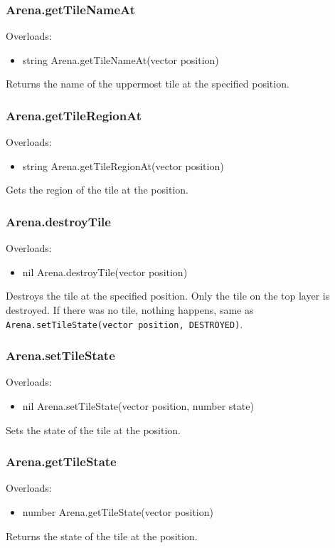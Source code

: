 \documentclass{book}
\newenvironment{ulist}
	{\begin{itemize}
			\itemsep0em}
	{\end{itemize}}
\begin{document}
\subsubsection{Arena.getTileNameAt}
Overloads:
\begin{ulist}
	\item string Arena.getTileNameAt(vector position)
\end{ulist}
Returns the name of the uppermost tile at the specified position.

\subsubsection{Arena.getTileRegionAt}
Overloads:
\begin{ulist}
	\item string Arena.getTileRegionAt(vector position)
\end{ulist}
Gets the region of the tile at the position.

\subsubsection{Arena.destroyTile}
Overloads:
\begin{ulist}
	\item nil Arena.destroyTile(vector position)
\end{ulist}
Destroys the tile at the specified position. Only the tile on the top layer is destroyed. If there was no tile, nothing happens, same as \texttt{Arena.setTileState(vector position, DESTROYED)}.

\subsubsection{Arena.setTileState}
Overloads:
\begin{ulist}
	\item nil Arena.setTileState(vector position, number state)
\end{ulist}
Sets the state of the tile at the position.

\subsubsection{Arena.getTileState}
Overloads:
\begin{ulist}
	\item number Arena.getTileState(vector position)
\end{ulist}
Returns the state of the tile at the position.
\end{document}
